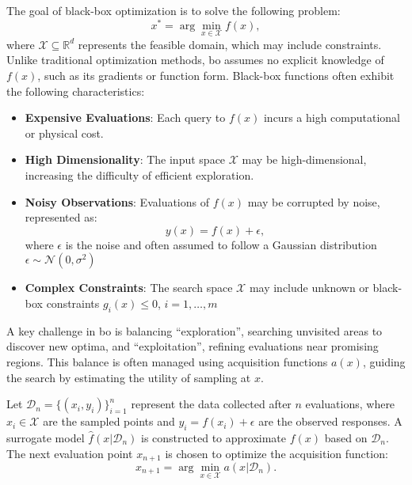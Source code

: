 The goal of black-box optimization is to solve the following problem:  
\[
x^* = \arg\min_{x \in \mathcal{X}} f(x),
\]  
where $\mathcal{X} \subseteq \mathbb{R}^d$ represents the feasible domain, which may include constraints. Unlike traditional optimization methods, \ac{bo} assumes no explicit knowledge of \( f(x) \), such as its gradients or function form.  Black-box functions often exhibit the following characteristics:  
\begin{itemize}
    \item \textbf{Expensive Evaluations}: Each query to \( f(x) \) incurs a high computational or physical cost. 
    \item \textbf{High Dimensionality}: The input space \( \mathcal{X} \) may be high-dimensional, increasing the difficulty of efficient exploration. 
    \item \textbf{Noisy Observations}: Evaluations of \( f(x) \) may be corrupted by noise, represented as:  
   \[
   y(x) = f(x) + \epsilon,
   \]  
   where $\epsilon$ is the noise and often assumed to follow a Gaussian distribution $\epsilon \sim \mathcal{N}(0, \sigma^2)$
\item \textbf{Complex Constraints}: The search space \( \mathcal{X} \) may include unknown or black-box constraints \( g_i(x) \leq 0 \), \( i = 1, \dots, m \)
\end{itemize}


A key challenge in \ac{bo} is balancing ``exploration'', searching unvisited areas to discover new optima, and ``exploitation'', refining evaluations near promising regions. This balance is often managed using acquisition functions \( a(x) \), guiding the search by estimating the utility of sampling at \( x \).  


Let \( \mathcal{D}_n = \{(x_i, y_i)\}_{i=1}^n \) represent the data collected after \( n \) evaluations, where \( x_i \in \mathcal{X} \) are the sampled points and \( y_i = f(x_i) + \epsilon \) are the observed responses. A surrogate model \( \hat{f}(x | \mathcal{D}_n) \) is constructed to approximate \( f(x) \) based on \( \mathcal{D}_n \). The next evaluation point \( x_{n+1} \) is chosen to optimize the acquisition function:  
\[
x_{n+1} = \arg\min_{x \in \mathcal{X}} a(x | \mathcal{D}_n).
\]  




